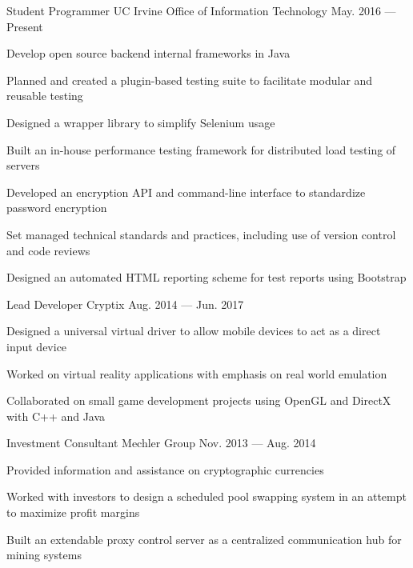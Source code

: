 
\begin{entries}
  \vspace{-1.0mm}
  \entry%
    {Student Programmer}%
    {UC Irvine Office of Information Technology}%
    {}%
    {May. 2016 --- Present}%
    {
      \begin{entryitems}
        \item Develop open source backend internal frameworks in Java
        \vspace{2.0mm}
        \begin{entryitems}
          \item Planned and created a plugin-based testing suite to facilitate modular and %
          reusable testing
          \item Designed a wrapper library to simplify Selenium usage
          \item Built an in-house performance testing framework for distributed load testing %
          of servers
          \item Developed an encryption API and command-line interface to standardize %
          password encryption
        \end{entryitems}
        \vspace{2.0mm}
        \item Set managed technical standards and practices, including use of version control %
        and code reviews
        \item Designed an automated HTML reporting scheme for test reports using Bootstrap
      \end{entryitems}
    }
  
  \entry%
    {Lead Developer}%
    {Cryptix}%
    {}%
    {Aug. 2014 --- Jun. 2017}%
    {
      \begin{entryitems}
        \item Designed a universal virtual driver to allow mobile devices to act as a direct %
        input device
        \item Worked on virtual reality applications with emphasis on real world emulation
        \item Collaborated on small game development projects using OpenGL and DirectX with %
        C++ and Java
      \end{entryitems}
    }

  \entry%
    {Investment Consultant}%
    {Mechler Group}%
    {}%
    {Nov. 2013 --- Aug. 2014}%
    {
      \begin{entryitems}
        \item Provided information and assistance on cryptographic currencies
        \item Worked with investors to design a scheduled pool swapping system in an attempt to %
        maximize profit margins
        \item Built an extendable proxy control server as a centralized communication %
        hub for mining systems
      \end{entryitems}
    }


\end{entries}
